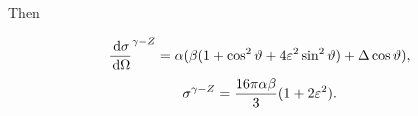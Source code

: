 \documentclass[]{article}
\begin{document}
Then

$$
\frac{\,\operatorname{d}\!{\sigma}}{\,\operatorname{d}\!{\Omega}}^{\gamma-Z }
  = \alpha(\beta(1+\cos^{2}{\vartheta}+4\varepsilon^{2}\sin^{2}{\vartheta})
    + \Delta\cos{\vartheta}
  ),
$$
\begin{equation}
\sigma^{\gamma-\Zzero} = \frac{16\pi\alpha\beta}{3}(1 + 2\varepsilon^{2}).
\end{equation}

\begin{thebibliography}{9}
\end{thebibliography}
\end{document}
